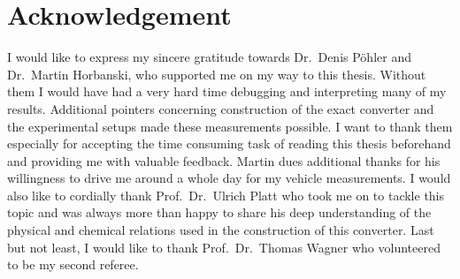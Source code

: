 \section{Acknowledgement}
\label{sec:acknowledgement}

I would like to express my sincere gratitude towards Dr.\ Denis Pöhler
and Dr.\ Martin Horbanski, who supported me on my way to this
thesis. Without them I would have had a very hard time debugging and
interpreting many of my results. Additional pointers concerning
construction of the exact converter and the experimental setups made
these measurements possible. I want to thank them especially for
accepting the time consuming task of reading this thesis beforehand
and providing me with valuable feedback. Martin dues additional thanks
for his willingness to drive me around a whole day for my vehicle
measurements. I would also like to cordially thank Prof.\ Dr.\ Ulrich
Platt who took me on to tackle this topic and was always more than
happy to share his deep understanding of the physical and chemical
relations used in the construction of this converter. Last but not
least, I would like to thank Prof.\ Dr.\ Thomas Wagner who volunteered
to be my second referee.

